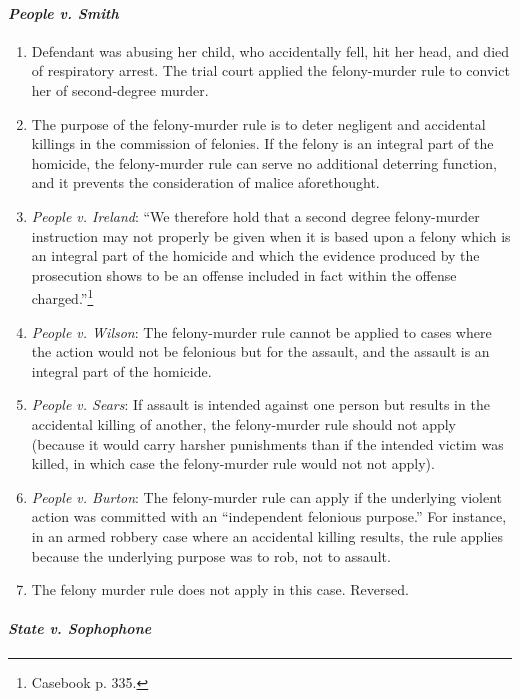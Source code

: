 \paragraph{\emph{People v. Smith}}

\begin{enumerate}
    \item Defendant was abusing her child, who accidentally fell, hit her head, and died of respiratory arrest. The trial court applied the felony-murder rule to convict her of second-degree murder.
    \item The purpose of the felony-murder rule is to deter negligent and accidental killings in the commission of felonies. If the felony is an integral part of the homicide, the felony-murder rule can serve no additional deterring function, and it prevents the consideration of malice aforethought.
    \item \emph{People v. Ireland}: ``We therefore hold that a second degree felony-murder instruction may not properly be given when it is based upon a felony which is an integral part of the homicide and which the evidence produced by the prosecution shows to be an offense included in fact within the offense charged.''\footnote{Casebook p. 335.}
    \item \emph{People v. Wilson}: The felony-murder rule cannot be applied to cases where the action would not be felonious but for the assault, and the assault is an integral part of the homicide.
    \item \emph{People v. Sears}: If assault is intended against one person but results in the accidental killing of another, the felony-murder rule should not apply (because it would carry harsher punishments than if the intended victim was killed, in which case the felony-murder rule would not not apply).
    \item \emph{People v. Burton}: The felony-murder rule can apply if the underlying violent action was committed with an ``independent felonious purpose.'' For instance, in an armed robbery case where an accidental killing results, the rule applies because the underlying purpose was to rob, not to assault.
    \item The felony murder rule does not apply in this case. Reversed.
\end{enumerate}

\paragraph{\emph{State v. Sophophone}}

